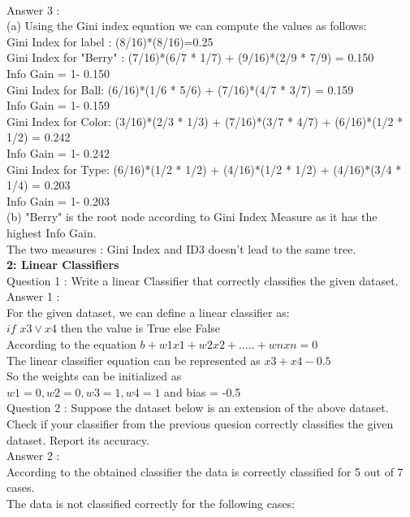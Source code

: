 \documentclass{article}
\begin{document}
\\[10pt]
Answer 3 :
\\[10pt] 
(a) Using the Gini index equation we can compute the values as follows:
\\[10pt]
Gini Index for label : (8/16)*(8/16)=0.25
\\[10pt]
Gini Index for "Berry" : (7/16)*(6/7 * 1/7) + (9/16)*(2/9 * 7/9) = 0.150
\\Info Gain = 1- 0.150
\\[10pt]
Gini Index for Ball: (6/16)*(1/6 * 5/6) + (7/16)*(4/7 * 3/7) = 0.159
\\Info Gain = 1- 0.159
\\[10pt]
Gini Index for Color: (3/16)*(2/3 * 1/3) + (7/16)*(3/7 * 4/7) + (6/16)*(1/2 * 1/2) = 0.242
\\Info Gain = 1- 0.242
\\[10pt]
Gini Index for Type: (6/16)*(1/2 * 1/2) + (4/16)*(1/2 * 1/2) + (4/16)*(3/4 * 1/4) = 0.203
\\Info Gain = 1- 0.203
\\[10pt]
(b) "Berry" is the root node according to Gini Index Measure as it has the highest Info Gain.
\\The two measures : Gini Index and ID3 doesn't lead to the same tree.
\\[10pt]
\textbf {2: Linear Classifiers}
\\[10pt]
Question 1 : Write a linear Classifier that correctly classifies the given dataset.
\\[10pt]
Answer 1 :
\\For the given dataset, we can define a linear classifier as: 
\\$ if $ $x3 \lor x4$ then the value is True else False
\\According to the equation $b + w1x1 + w2x2 +.....+ wnxn=0$
\\The linear classifier equation can be represented as $x3 + x4 - 0.5$
\\So the weights can be initialized as 
\\$w1=0, w2=0, w3=1, w4=1$ and bias = -0.5
\\[10pt]
Question 2 : Suppose the dataset below is an extension of the above dataset. Check if your classifier from the previous quesion correctly classifies the given dataset. Report its accuracy.
\\[10pt]
Answer 2 : 
\\According to the obtained classifier the data is correctly classified for 5 out of 7 cases.
\\The data is not classified correctly for the following cases:
\end{document}
